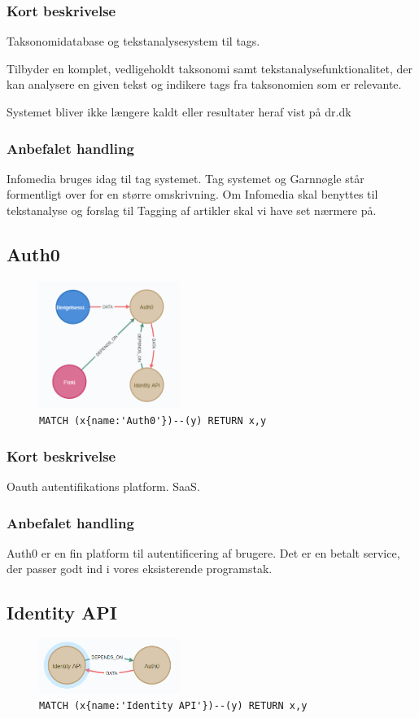 \documentclass{article}
\begin{document}
\subsubsection*{Kort beskrivelse}
Taksonomidatabase og tekstanalysesystem til tags.

Tilbyder en komplet, vedligeholdt taksonomi samt tekstanalysefunktionalitet, der kan analysere en given tekst og indikere tags fra taksonomien som er relevante.

Systemet bliver ikke længere kaldt eller resultater heraf vist på dr.dk
\subsubsection*{Anbefalet handling}
Infomedia bruges idag til tag systemet. Tag systemet og Garnnøgle står formentligt over for en større omskrivning. Om Infomedia skal benyttes til tekstanalyse og forslag til Tagging af artikler skal vi have set nærmere på.



\subsection{Auth0}
\begin{figure}[H]
\includegraphics[width=130pt]{Auth0.PNG}
\cprotect\caption{\verb|MATCH (x{name:'Auth0'})--(y) RETURN x,y|}
\end{figure}
\subsubsection*{Kort beskrivelse}
Oauth autentifikations platform. SaaS.
\subsubsection*{Anbefalet handling}
Auth0 er en fin platform til autentificering af brugere. Det er en betalt service, der passer godt ind i vores eksisterende programstak. 



\subsection{Identity API}
\begin{figure}[H]
\includegraphics[width=130pt]{Identity.PNG}
\cprotect\caption{\verb|MATCH (x{name:'Identity API'})--(y) RETURN x,y|}
\end{figure}
\end{document}

